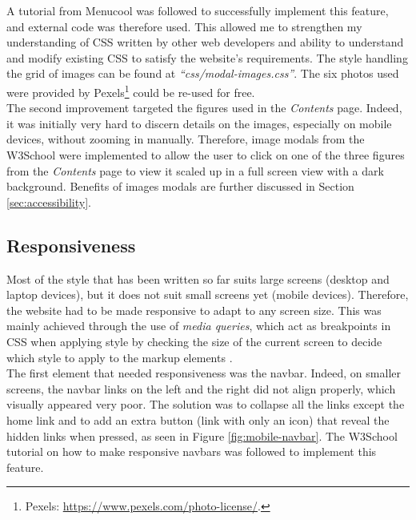 \documentclass[letterpaper,12pt]{article}
\begin{document}
A tutorial from Menucool \cite{menucool} was followed to successfully implement this feature, and external code was therefore used. This allowed me to strengthen my understanding of CSS written by other web developers and ability to understand and modify existing CSS to satisfy the website's requirements. The style handling the grid of images can be found at \textit{``css/modal-images.css''}. The six photos used were provided by Pexels\footnote{Pexels: \url{https://www.pexels.com/photo-license/}.} could be re-used for free.\\

The second improvement targeted the figures used in the \textit{Contents} page. Indeed, it was initially very hard to discern details on the images, especially on mobile devices, without zooming in manually. Therefore, image modals from the W3School \cite{w3s-image-modals} were implemented to allow the user to click on one of the three figures from the \textit{Contents} page to view it scaled up in a full screen view with a dark background. Benefits of images modals are further discussed in Section \ref{sec:accessibility}.

\subsection{Responsiveness}

Most of the style that has been written so far suits large screens (desktop and laptop devices), but it does not suit small screens yet (mobile devices). Therefore, the website had to be made responsive to adapt to any screen size. This was mainly achieved through the use of \textit{media queries}, which act as breakpoints in CSS when applying style by checking the size of the current screen to decide which style to apply to the markup elements \cite{responsive-media-queries}.\\

The first element that needed responsiveness was the navbar. Indeed, on smaller screens, the navbar links on the left and the right did not align properly, which visually appeared very poor. The solution was to collapse all the links except the home link and to add an extra button (link with only an icon) that reveal the hidden links when pressed, as seen in Figure \ref{fig:mobile-navbar}. The W3School tutorial on how to make responsive navbars \cite{responsive-navbar} was followed to implement this feature.
\end{document}
